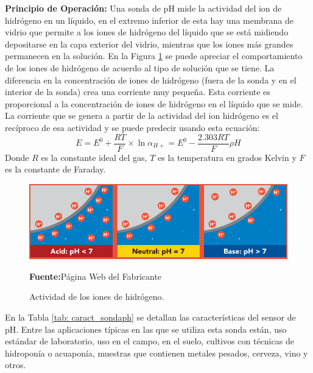 \textbf{Principio de Operación: }Una sonda de pH mide la actividad del ion de hidrógeno en un líquido, en el extremo inferior de esta hay una membrana de vidrio que permite a los iones de hidrógeno del líquido que se está midiendo depositarse en la capa exterior del vidrio, mientras que los iones más grandes permanecen en la solución. En la Figura \ref{fig:phGrafico} se puede apreciar el comportamiento de los iones de hidrógeno de acuerdo al tipo de solución que se tiene. La diferencia en la concentración de iones de hidrógeno (fuera de la sonda y en el interior de la sonda) crea una corriente muy pequeña. Esta corriente es proporcional a la concentración de iones de hidrógeno en el líquido que se mide.
La corriente que se genera a partir de la actividad del ion hidrógeno es el recíproco de esa actividad y se puede predecir usando esta ecuación:
\begin{equation}
E=E^0 + \frac{RT}{F}\times \ln\alpha_{H+} = E^0 - \frac{2.303RT}{F}\rho H
\label{eq:iv}
\end{equation}
Donde $R$ es la constante ideal del gas, $T$ es la temperatura en grados Kelvin y $F$ es la constante de Faraday.
\newline
\hfill
\begin{figure}[H]
\centering
	\includegraphics[width=\textwidth]{Imagenes/2021/imag22.png}%
	\caption[Actividad de los iones de hidrógeno]{Actividad de los iones de hidrógeno.  }{\textbf{Fuente:}P\'agina Web del Fabricante \cite{atlasph}}
	\label{fig:phGrafico}
\end{figure}

En la Tabla \ref{tab: caract_sondaph} se detallan las características del sensor de pH.
\newline
\hfill
Entre las aplicaciones típicas en las que se utiliza esta sonda están, uso estándar de laboratorio, uso en el campo, en el suelo, cultivos con técnicas de hidropon\'ia o acuapon\'ia, muestras que contienen metales pesados, cerveza, vino y otros.

